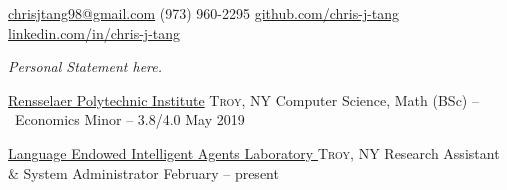 \documentclass[11pt,a4paper]{article}
\begin{document}
\sloppy  %



\nobreakvspace{0.3em}  %

\noindent\href{mailto:chrisjtang98.at.gmail.dot.com}{chrisjtang98\mbox{}@\mbox{}gmail.com}\sbull
\textsmaller(973) 960-2295\sbull
\href{https://github.com/chris-j-tang}{github.com/chris-j-tang}\sbull
\href{https://www.linkedin.com/in/chris-j-tang/}{linkedin.com/in/chris-j-tang}

\spacedhrule{0.9em}{-0.4em}  %


\vspace{-1.3em}  %
\begin{multicols}{2}  %
\noindent \emph{Personal Statement here.}
\end{multicols}

\spacedhrule{-0.2em}{-0.4em}


\headedsection
  {\href{http://rpi.edu/}{Rensselaer Polytechnic Institute}}
  {\textsc{Troy, NY}} {%
  \headedsubsection
    {Computer Science, Math (BSc) -- \textnormal{~Economics Minor} -- 3.8/4.0}
    {May 2019} {\\}
}

\spacedhrule{0em}{-0.4em}


\headedsection
  {\href{http://www.hass.rpi.edu/pl/hass-research-facilities/?objectID=10049}{Language Endowed Intelligent Agents Laboratory }}
    {\textsc{Troy, NY}} {%
    \headedsubsection
      {Research Assistant \& System Administrator}
      {February  -- present}
      {}
  }
  
\end{document}
